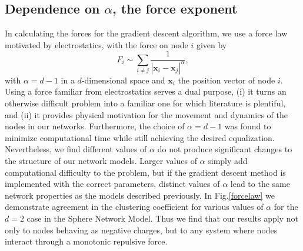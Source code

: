 \documentclass[aps,pre,manuscript,superscriptaddress,amsmath,amssymb,nofootinbib]{revtex4-1}
\begin{document}
\subsection{Dependence on $\alpha$, the force exponent}
\label{sub:forcelaw}
In calculating the forces for the gradient descent algorithm, we use a force law motivated by electrostatics, with the force on node $i$ given by 
\begin{equation}
F_i \sim \sum_{i \neq j} \frac{1}{|\textbf{x}_i - \textbf{x}_j|^{\alpha}}, 
\end{equation}
with $\alpha = d-1$ in a $d$-dimensional space and $\textbf{x}_i$ the position vector of node $i$.
Using a force familiar from electrostatics serves a dual purpose, (i) it turns an otherwise difficult problem into a familiar one for which literature is plentiful, and (ii) it provides physical motivation for the movement and dynamics of the nodes in our networks.
Furthermore, the choice of $\alpha = d-1$ was found to minimize computational time while still achieving the desired equalization.
Nevertheless, we find different values of $\alpha$ do not produce significant changes to the structure of our network models.
Larger values of $\alpha$ simply add computational difficulty to the problem, but if the gradient descent method is implemented with the correct parameters, distinct values of $\alpha$ lead to the same network properties as the models described previously.
In Fig.\ref{forcelaw} we demonstrate agreement in the clustering coefficient for various values of $\alpha$ for the $d=2$ case in the Sphere Network Model.
Thus we find that our results apply not only to nodes behaving as negative charges, but to any system where nodes interact through a monotonic repulsive force.
\end{document}
